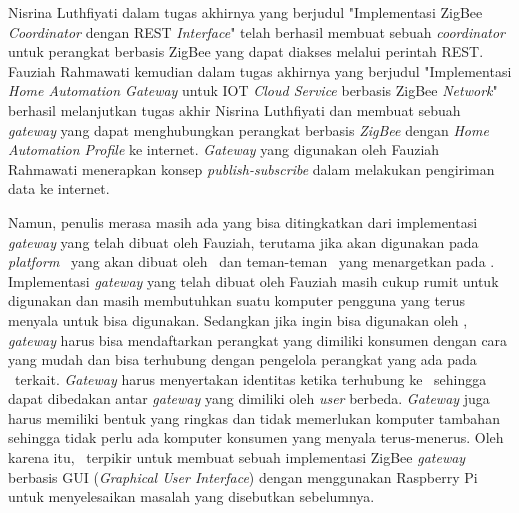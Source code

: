 Nisrina Luthfiyati dalam tugas akhirnya yang berjudul "Implementasi ZigBee \textit{Coordinator} dengan REST \textit{Interface}"\cite{SkripsiNina} telah berhasil membuat sebuah \textit{coordinator} untuk perangkat berbasis ZigBee yang dapat diakses melalui perintah REST. Fauziah Rahmawati kemudian dalam tugas akhirnya yang berjudul "Implementasi \textit{Home Automation Gateway} untuk IOT \textit{Cloud Service} berbasis ZigBee \textit{Network}"\cite{SkripsiFarah} berhasil melanjutkan tugas akhir Nisrina Luthfiyati dan membuat sebuah \textit{gateway} yang dapat menghubungkan perangkat berbasis \textit{ZigBee} dengan \textit{Home Automation Profile} ke internet. \textit{Gateway} yang digunakan oleh Fauziah Rahmawati menerapkan konsep \textit{publish-subscribe} dalam melakukan pengiriman data ke internet.

Namun, penulis merasa masih ada yang bisa ditingkatkan dari implementasi \textit{gateway} yang telah dibuat oleh Fauziah, terutama jika akan digunakan pada \textit{platform} \iot~yang akan dibuat oleh \saya~dan teman-teman \saya~yang menargetkan pada \eu. Implementasi \textit{gateway} yang telah dibuat oleh Fauziah masih cukup rumit untuk digunakan dan masih membutuhkan suatu komputer pengguna yang terus menyala untuk bisa digunakan. Sedangkan jika ingin bisa digunakan oleh \eu, \textit{gateway} harus bisa mendaftarkan perangkat yang dimiliki konsumen dengan cara yang mudah dan bisa terhubung dengan pengelola perangkat yang ada pada \plat~terkait. \textit{Gateway} harus menyertakan identitas ketika terhubung ke \plat~sehingga dapat dibedakan antar \textit{gateway} yang dimiliki oleh \textit{user} berbeda. \textit{Gateway} juga harus memiliki bentuk yang ringkas dan tidak memerlukan komputer tambahan sehingga tidak perlu ada komputer konsumen yang menyala terus-menerus. Oleh karena itu, \saya~terpikir untuk membuat sebuah implementasi ZigBee \textit{gateway} berbasis GUI (\textit{Graphical User Interface}) dengan menggunakan Raspberry Pi untuk menyelesaikan masalah yang disebutkan sebelumnya.


